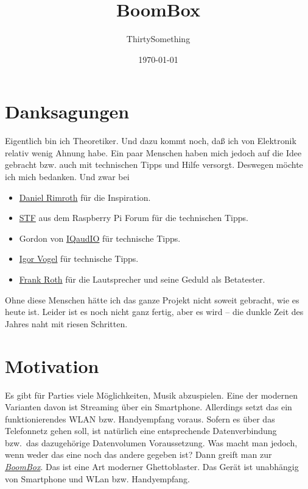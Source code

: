\documentclass[12pt,a4paper]{article}
\author{ThirtySomething}
\title{BoomBox}
\date{\today}
\newcommand{\bb}{\textit{\href{https://github.com/ThirtySomething/BoomBox}{BoomBox}}}
\begin{document}
\clearpage\maketitle
\thispagestyle{empty}
\newpage

\tableofcontents
{}
\newpage

\section{Danksagungen}
Eigentlich bin ich Theoretiker. Und dazu kommt noch, daß ich von Elektronik relativ wenig Ahnung habe. Ein paar Menschen haben mich jedoch auf die Idee
gebracht bzw. auch mit technischen Tipps und Hilfe versorgt. Deswegen möchte ich mich bedanken. Und zwar bei

\begin{itemize}
    \item \href{http://hellochili.de/}{Daniel Rimroth} für die Inspiration.
    \item \href{https://forum-raspberrypi.de/forum/thread/40895-ermittlung-strombedarf/?postID=354867&highlight=thirtysomething#post354867}{STF} aus dem
                Raspberry Pi Forum für die technischen Tipps.
    \item Gordon von \href{http://iqaudio.co.uk/}{IQaudIO} für technische Tipps.
    \item \href{https://www.xing.com/profile/Igor_Vogel2}{Igor Vogel} für technische Tipps.
    \item \href{http://roth-komplettservice.de/}{Frank Roth} für die Lautsprecher und seine Geduld als Betatester.
\end{itemize}

Ohne diese Menschen hätte ich das ganze Projekt nicht soweit gebracht, wie es heute ist. Leider ist es noch nicht ganz fertig, aber es wird -- die dunkle
Zeit des Jahres naht mit riesen Schritten.

\section{Motivation}
Es gibt für Parties viele Möglichkeiten, Musik abzuspielen. Eine der modernen Varianten davon ist Streaming über ein Smartphone. Allerdings setzt das
ein funktionierendes WLAN bzw. Handyempfang voraus. Sofern es über das Telefonnetz gehen soll, ist natürlich eine entsprechende Datenverbindung bzw.~das
dazugehörige Datenvolumen Voraussetzung. Was macht man jedoch, wenn weder das eine noch das andere gegeben ist? Dann greift man zur \bb{}.
Das ist eine Art moderner Ghettoblaster. Das Gerät ist unabhängig von Smartphone und WLan bzw. Handyempfang.
\end{document}
